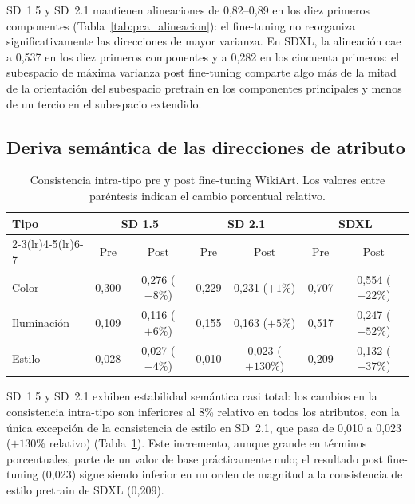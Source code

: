 \documentclass[12pt, a4paper, twoside]{book}
\begin{document}
SD~1.5 y SD~2.1 mantienen alineaciones de 0,82--0,89 en los diez primeros componentes
(Tabla~\ref{tab:pca_alineacion}): el fine-tuning no reorganiza significativamente las
direcciones de mayor varianza.
En SDXL, la alineación cae a 0,537 en los diez primeros componentes y a 0,282 en los
cincuenta primeros: el subespacio de máxima varianza post fine-tuning comparte algo más de
la mitad de la orientación del subespacio pretrain en los componentes principales y menos
de un tercio en el subespacio extendido.

\subsection{Deriva semántica de las direcciones de atributo}
\label{subsec:res:deriva_semantica}

\begin{table}[htb]
\centering
\caption{Consistencia intra-tipo pre y post fine-tuning WikiArt. Los valores entre
paréntesis indican el cambio porcentual relativo.}
\label{tab:deriva_semantica_consistencia}
\small
\begin{tabular}{lcccccc}
\toprule
\textbf{Tipo} & \multicolumn{2}{c}{\textbf{SD 1.5}} & \multicolumn{2}{c}{\textbf{SD 2.1}} &
\multicolumn{2}{c}{\textbf{SDXL}} \\
\cmidrule(lr){2-3}\cmidrule(lr){4-5}\cmidrule(lr){6-7}
 & Pre & Post & Pre & Post & Pre & Post \\
\midrule
Color       & 0,300 & 0,276 {\small($-8\%$)}   & 0,229 & 0,231 {\small($+1\%$)}   &
0,707 & 0,554 {\small($-22\%$)} \\
Iluminación & 0,109 & 0,116 {\small($+6\%$)}   & 0,155 & 0,163 {\small($+5\%$)}   &
0,517 & 0,247 {\small($-52\%$)} \\
Estilo      & 0,028 & 0,027 {\small($-4\%$)}   & 0,010 & 0,023 {\small($+130\%$)} &
0,209 & 0,132 {\small($-37\%$)} \\
\bottomrule
\end{tabular}
\end{table}

SD~1.5 y SD~2.1 exhiben estabilidad semántica casi total: los cambios en la consistencia
intra-tipo son inferiores al 8\% relativo en todos los atributos, con la única excepción de la
consistencia de estilo en SD~2.1, que pasa de 0,010 a 0,023 ($+130\%$ relativo)
(Tabla~\ref{tab:deriva_semantica_consistencia}).
Este incremento, aunque grande en términos porcentuales, parte de un valor de base prácticamente
nulo; el resultado post fine-tuning (0,023) sigue siendo inferior en un orden de magnitud a la
consistencia de estilo pretrain de SDXL (0,209).
\end{document}
